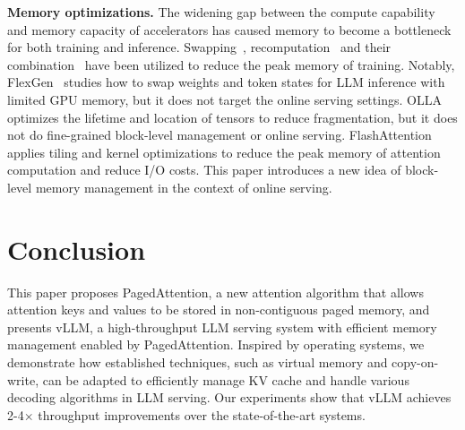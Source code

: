 \textbf{Memory optimizations.} The widening gap between the compute capability and memory capacity of accelerators has caused memory to become a bottleneck for both training and inference. Swapping~\cite{huang2020swapadvisor,wang2018superneurons,ren2021zero}, recomputation~\cite{chen2016training,jain2020checkmate} and their combination~\cite{patil2022poet} have been utilized to reduce the peak memory of training. Notably, FlexGen~\cite{sheng2023high} studies how to swap weights and token states for LLM inference with limited GPU memory, but it does not target the online serving settings. OLLA~\cite{steiner2022olla} optimizes the lifetime and location of tensors to reduce fragmentation, but it does not do fine-grained block-level management or online serving. FlashAttention~\cite{dao2022flashattention} applies tiling and kernel optimizations to reduce the peak memory of attention computation and reduce I/O costs. This paper introduces a new idea of block-level memory management in the context of online serving.

\section{Conclusion}
This paper proposes PagedAttention, a new attention algorithm that allows attention keys and values to be stored in non-contiguous paged memory, and presents vLLM, a high-throughput LLM serving system with efficient memory management enabled by PagedAttention. Inspired by operating systems, we demonstrate how established techniques, such as virtual memory and copy-on-write, can be adapted to efficiently manage KV cache and handle various decoding algorithms in LLM serving. Our experiments show that vLLM achieves 2-4$\times$ throughput improvements over the state-of-the-art systems.


